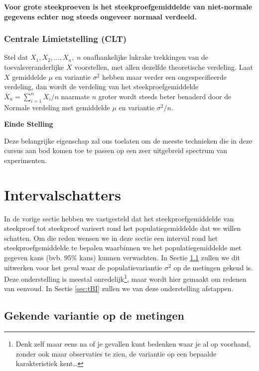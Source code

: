 \documentclass[
  12pt,dutch,coursenotes]{book}
\theoremstyle{definition}
\theoremstyle{definition}
\theoremstyle{definition}
\theoremstyle{definition}
\theoremstyle{remark}
\begin{document}
\textbf{Voor grote steekproeven is het steekproefgemiddelde van niet-normale gegevens echter nog steeds ongeveer normaal verdeeld.}

\hypertarget{centrale-limietstelling-clt}{%
\subsubsection{Centrale Limietstelling (CLT)}\label{centrale-limietstelling-clt}}

Stel dat \(X_1, X_2, \dots, X_n, \; n\) onafhankelijke lukrake trekkingen van
de toevalsveranderlijke \(X\) voorstellen, met allen dezelfde theoretische
verdeling. Laat \(X\) gemiddelde \(\mu\) en variantie \(\sigma^2\) hebben maar
verder een ongespecifieerde verdeling, dan wordt de verdeling van het
steekproefgemiddelde \(\bar{X}_n = {\sum_{i=1}^{n} X_i}/{n}\) naarmate \(n\)
groter wordt steeds beter benaderd door de Normale verdeling met gemiddelde \(\mu\) en variantie \(\sigma^2/n.\)

\textbf{Einde Stelling}

Deze belangrijke eigenschap zal ons toelaten om de meeste technieken die in deze cursus aan bod komen toe te passen op een zeer uitgebreid spectrum van experimenten.

\hypertarget{intervalschatters}{%
\section{Intervalschatters}\label{intervalschatters}}

In de vorige sectie hebben we vastgesteld dat het steekproefgemiddelde van
steekproef tot steekproef varieert rond het populatiegemiddelde dat we
willen schatten.
Om die reden wensen we in deze sectie een interval rond het
steekproefgemiddelde te bepalen waarbinnen we het populatiegemiddelde met
gegeven kans (bvb. 95\% kans) kunnen verwachten.
In Sectie \ref{subsec:bigek} zullen we dit uitwerken voor het geval waar de populatievariantie \(\sigma^2\)
op de metingen gekend is.
Deze onderstelling is meestal onredelijk\footnote{Denk zelf maar eens na of je gevallen kunt bedenken waar je al op voorhand,
  zonder ook maar observaties te zien, de variantie op een bepaalde
  karakteristiek kent\ldots{}}, maar wordt hier gemaakt om redenen van eenvoud.
In Sectie \ref{sec:tBI} zullen we van deze onderstelling afstappen.

\hypertarget{subsec:bigek}{%
\subsection{Gekende variantie op de metingen}\label{subsec:bigek}}
\end{document}
